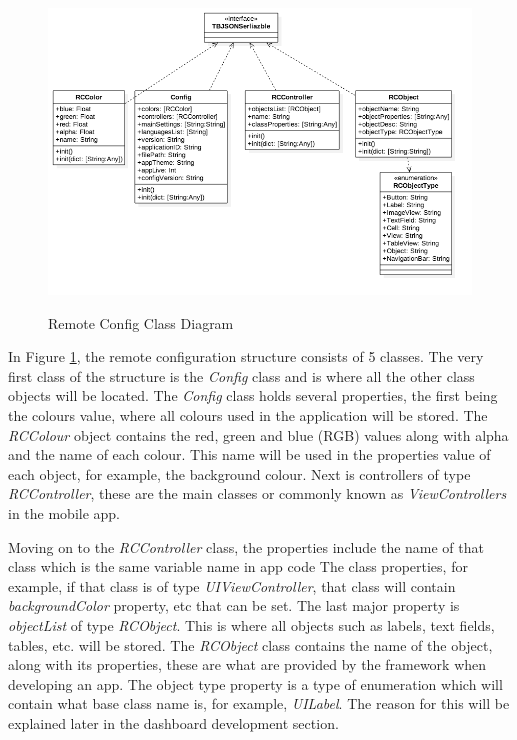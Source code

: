 \begin{figure}[!h]
    \caption{Remote Config Class Diagram}
    \centering
    \includegraphics[width=150mm]{images/classdiagrams/config}
    \label{fig:rc-cd}
\end{figure}

In Figure \ref{fig:rc-cd}, the remote configuration structure consists of 5 classes. The very first class of the structure is the \textit{Config} class and is where all the other class objects will be located. The \textit{Config} class holds several properties, the first being the colours value, where all colours used in the application will be stored. The \textit{RCColour} object contains the red, green and blue (RGB) values along with alpha and the name of each colour. This name will be used in the properties value of each object, for example, the background colour. Next is controllers of type \textit{RCController}, these are the main classes or commonly known as \textit{ViewControllers} in the mobile app.

Moving on to the \textit{RCController} class, the properties include the name of that class which is the same variable name in app code The class properties, for example, if that class is of type \textit{UIViewController}, that class will contain \textit{backgroundColor} property, etc that can be set. The last major property is \textit{objectList} of type \textit{RCObject}. This is where all objects such as labels, text fields, tables, etc. will be stored. The \textit{RCObject} class contains the name of the object, along with its properties, these are what are provided by the framework when developing an app. The object type property is a type of enumeration which will contain what base class name is, for example, \textit{UILabel}. The reason for this will be explained later in the dashboard development section.

